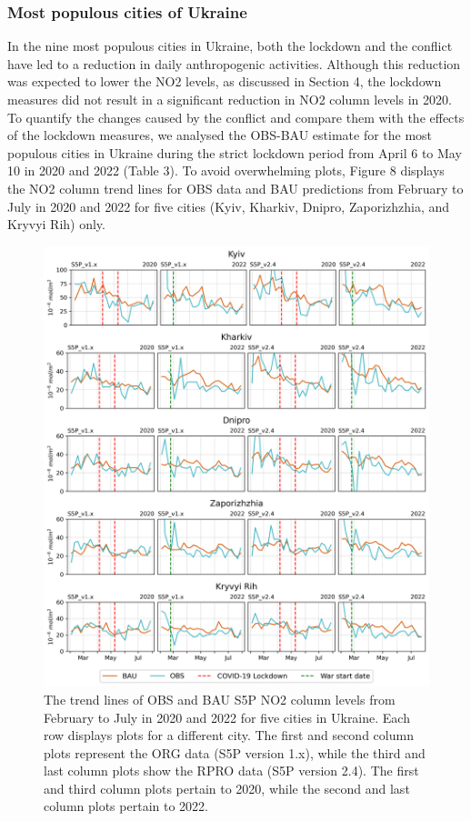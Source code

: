 \subsubsection*{Most populous cities of Ukraine}
In the nine most populous cities in Ukraine, both the lockdown and the conflict have led to a reduction in daily anthropogenic activities. Although this reduction was expected to lower the NO2 levels, as discussed in Section 4, the lockdown measures did not result in a significant reduction in NO2 column levels in 2020. To quantify the changes caused by the conflict and compare them with the effects of the lockdown measures, we analysed the OBS-BAU estimate for the most populous cities in Ukraine during the strict lockdown period from April 6 to May 10 in 2020 and 2022 (Table 3). To avoid overwhelming plots, Figure 8 displays the NO2 column trend lines for OBS data and BAU predictions from February to July in 2020 and 2022 for five cities (Kyiv, Kharkiv, Dnipro, Zaporizhzhia, and Kryvyi Rih) only.\par
\begin{figure}
    \centering
    \includegraphics[width=\textwidth]{figs/chap3/fig8.png}
    \caption{The trend lines of OBS and BAU S5P NO2 column levels from February to July in 2020 and 2022 for five cities in Ukraine. Each row displays plots for a different city. The first and second column plots represent the ORG data (S5P version 1.x), while the third and last column plots show the RPRO data (S5P version 2.4). The first and third column plots pertain to 2020, while the second and last column plots pertain to 2022.}
    \label{fig:fig8}
\end{figure}

